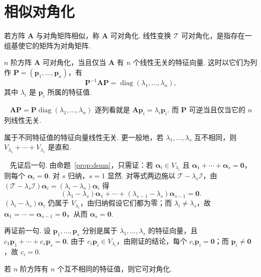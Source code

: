 \documentclass[lang=cn,10.5pt,scheme=chinese,toc=twocol,section,chinesefont=nofont,
twoside,citestyle=gb7714-2015,bibstyle=gb7714-2015]{elegantbook}
\DeclareRobustCommand{\textbf}[1]{{\lnsemiboldlatin\lnsemiboldcjk #1}}
\newcommand{\vv}[1]{\boldsymbol{#1}}
\newcommand{\zero}{\boldsymbol{0}}          %
\numberwithin{equation}{section}   %
\newcommand{\diag}{\operatorname{diag}}
\newcommand*{\lnlabel}[1]{{\sffamily\bfseries\color{black}#1}}
\renewenvironment{proof}{%
	\par\noindent\lnlabel{\proofname}\;\ \color{black!90}\cfs}{\par}
\begin{document}
\section{相似对角化}

\begin{definition}
  若方阵 $\vv A$ 与对角矩阵相似，称 $\vv A$ \textbf{可对角化}. 线性变换 $\mathscr T$ 可对角化，是指存在一组基使它的矩阵为对角矩阵.
\end{definition}

\begin{theorem}
  \label{thm:diagbasis}
  $n$ 阶方阵 $\vv A$ 可对角化，当且仅当 $\vv A$ 有 $n$ 个线性无关的特征向量. 这时以它们为列作 $\vv P=(\vv p_1,\ldots,\vv p_n)$，有
  \[\vv P^{-1}\vv{AP}=\diag(\lambda_1,\ldots,\lambda_n),\]
  其中 $\lambda_i$ 是 $\vv p_i$ 所属的特征值.
\end{theorem}
\begin{proof}
  $\vv{AP}=\vv P\diag(\lambda_1,\ldots,\lambda_n)$ 逐列看就是 $\vv A\vv p_i=\lambda_i\vv p_i$. 而 $\vv P$ 可逆当且仅当它的 $n$ 列线性无关.
\end{proof}

\begin{theorem}
  \label{thm:distinctindep}
  属于不同特征值的特征向量线性无关. 更一般地，若 $\lambda_1,\ldots,\lambda_s$ 互不相同，则 $V_{\lambda_1}+\cdots+V_{\lambda_s}$ 是直和.
\end{theorem}
\begin{proof}
  先证后一句. 由命题~\ref{prop:dsum}，只需证：若 $\vv\alpha_i\in V_{\lambda_i}$ 且 $\vv\alpha_1+\cdots+\vv\alpha_s=\zero$，则每个 $\vv\alpha_i=\zero$. 对 $s$ 归纳，$s=1$ 显然. 对等式两边施以 $\mathscr T-\lambda_s\mathscr I$，由 $(\mathscr T-\lambda_s\mathscr I)\vv\alpha_i=(\lambda_i-\lambda_s)\vv\alpha_i$ 得
  \[(\lambda_1-\lambda_s)\vv\alpha_1+\cdots+(\lambda_{s-1}-\lambda_s)\vv\alpha_{s-1}=\zero.\]
  $(\lambda_i-\lambda_s)\vv\alpha_i$ 仍属于 $V_{\lambda_i}$，由归纳假设它们都为零；而 $\lambda_i\ne\lambda_s$，故 $\vv\alpha_1=\cdots=\vv\alpha_{s-1}=\zero$，从而 $\vv\alpha_s=\zero$.

  再证前一句. 设 $\vv p_1,\ldots,\vv p_s$ 分别是属于 $\lambda_1,\ldots,\lambda_s$ 的特征向量，且 $c_1\vv p_1+\cdots+c_s\vv p_s=\zero$. 由于 $c_i\vv p_i\in V_{\lambda_i}$，由刚证的结论，每个 $c_i\vv p_i=\zero$；而 $\vv p_i\ne\zero$，故 $c_i=0$.
\end{proof}

\begin{corollary}
  若 $n$ 阶方阵有 $n$ 个互不相同的特征值，则它可对角化.
\end{corollary}
\end{document}
